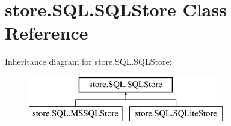 \hypertarget{classstore_1_1_s_q_l_1_1_s_q_l_store}{\section{store.\-S\-Q\-L.\-S\-Q\-L\-Store Class Reference}
\label{classstore_1_1_s_q_l_1_1_s_q_l_store}
}
Inheritance diagram for store.\-S\-Q\-L.\-S\-Q\-L\-Store\-:\begin{figure}[H]
\begin{center}
\leavevmode
\includegraphics[height=2.000000cm]{classstore_1_1_s_q_l_1_1_s_q_l_store}
\end{center}
\end{figure}
